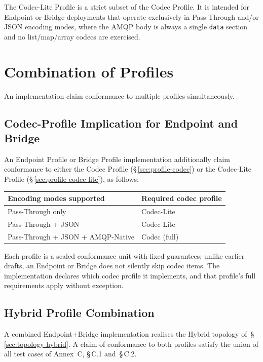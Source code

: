 \documentclass{../styles/zerodds-vendor-spec}
\begin{document}
The Codec-Lite Profile is a strict subset of the Codec Profile.
It is intended for Endpoint or Bridge deployments that operate
exclusively in Pass-Through and/or JSON encoding modes, where
the AMQP body is always a single \texttt{data} section and no
list/map/array codecs are exercised.

\section{Combination of Profiles}

An implementation  claim conformance to multiple
profiles simultaneously.

\subsection{Codec-Profile Implication for Endpoint and Bridge}\label{sec:codec-implication}

An Endpoint Profile or Bridge Profile implementation
 additionally claim conformance to either the
Codec Profile (\S\,\ref{sec:profile-codec}) or the Codec-Lite
Profile (\S\,\ref{sec:profile-codec-lite}), as follows:

\begin{longtable}{p{4.0cm}p{8.0cm}}
  \toprule
  \textbf{Encoding modes supported} & \textbf{Required codec profile} \\
  \midrule
  \endhead
  Pass-Through only         & Codec-Lite \\
  Pass-Through + JSON       & Codec-Lite \\
  Pass-Through + JSON + AMQP-Native & Codec (full) \\
  \bottomrule
\end{longtable}

Each profile is a sealed conformance unit with fixed guarantees;
unlike earlier drafts, an Endpoint or Bridge does not silently
skip codec items. The implementation declares which codec
profile it implements, and that profile's full requirements
apply without exception.

\subsection{Hybrid Profile Combination}

A combined Endpoint+Bridge implementation realises the Hybrid
topology of~\S\,\ref{sec:topology-hybrid}. A claim of conformance
to both profiles  satisfy the union of all test cases of
Annex~C, \S\,C.1 and~\S\,C.2.
\end{document}
